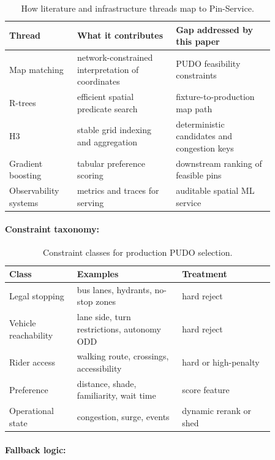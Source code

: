 \documentclass{article}
\begin{document}
\begin{table}[t]
\centering
\caption{How literature and infrastructure threads map to Pin-Service.}
\begin{tabular}{@{}p{0.22\linewidth}p{0.32\linewidth}p{0.32\linewidth}@{}}
\toprule
\textbf{Thread} & \textbf{What it contributes} & \textbf{Gap addressed by this paper}\\
\midrule
Map matching & network-constrained interpretation of coordinates & PUDO feasibility constraints\\
R-trees & efficient spatial predicate search & fixture-to-production map path\\
H3 & stable grid indexing and aggregation & deterministic candidates and congestion keys\\
Gradient boosting & tabular preference scoring & downstream ranking of feasible pins\\
Observability systems & metrics and traces for serving & auditable spatial ML service\\
\bottomrule
\end{tabular}
\end{table}

\paragraph{Constraint taxonomy:}

\begin{table}[t]
\centering
\caption{Constraint classes for production PUDO selection.}
\begin{tabular}{@{}p{0.22\linewidth}p{0.34\linewidth}p{0.30\linewidth}@{}}
\toprule
\textbf{Class} & \textbf{Examples} & \textbf{Treatment}\\
\midrule
Legal stopping & bus lanes, hydrants, no-stop zones & hard reject\\
Vehicle reachability & lane side, turn restrictions, autonomy ODD & hard reject\\
Rider access & walking route, crossings, accessibility & hard or high-penalty\\
Preference & distance, shade, familiarity, wait time & score feature\\
Operational state & congestion, surge, events & dynamic rerank or shed\\
\bottomrule
\end{tabular}
\end{table}

\paragraph{Fallback logic:}
\end{document}
